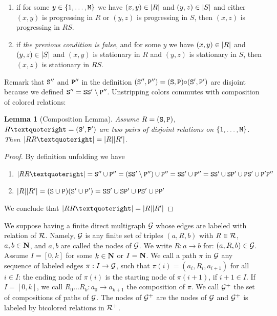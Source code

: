 \documentclass{lmcs}
\newtheorem{lemma}[theorem]{Lemma}
\begin{document}
\begin{enumerate}
\item
if for some $y\in \{1, \ldots, {\tt M}\}$ we have $(x,y) \in {| R |}$ and $(y,z) \in {| S |}$ and either 
$(x,y)$ is progressing in $R$ or $(y,z)$ is progressing in $S$, then  
$(x,z)$ is progressing in $RS$. 

\item
if \emph{the previous condition is false}, and for some $y$ we have
$(x,y) \in {| R |}$ and $(y,z) \in {| S |}$  and $(x,y)$ is stationary
in $R$ and $(y,z)$ is stationary in $S$, then  $(x,z)$ is stationary in $RS$. 
\end{enumerate}

Remark that ${\tt S}''$ and ${\tt P}''$ in the definition
 $({\tt S}'',{\tt P}'') = ({\tt S},{\tt P}) {\circ} ({\tt S}',{\tt P}')$ are disjoint 
because we defined ${\tt S}'' = {\tt S}{\tt S}' \setminus {\tt P}''$. 
Unstripping colors commutes with composition of colored relations:

\begin{lemma}[Composition Lemma]
\label{lemma-composition}
Assume $R=({\tt S},{\tt P})$, $R’=(\Stat',\Prog')$ are two pairs of disjoint relations on 
$\{1, \ldots, {\tt M}\}$. Then $\universe{RR’} = \universe{R}\universe{R'}$.
\end{lemma}

\begin{proof}
By definition unfolding we have 
\begin{enumerate}
\item
$
\universe{RR’} = 
\Stat'' \cup \Prog'' = 
(\Stat\Stat'\setminus \Prog'') \cup \Prog'' = 
\Stat\Stat'\cup \Prog'' = 
\Stat\Stat'\cup \Stat\Prog' \cup \Prog\Stat'\cup \Prog'\Prog''$

\item
$
{| R |}{| R' |} = 
({\tt S} \cup {\tt P})({\tt S}'\cup {\tt P}') = 
{\tt S}{\tt S}'\cup {\tt S}{\tt P}' \cup {\tt P}{\tt S}'\cup {\tt P}{\tt P}'
$
\end{enumerate}
We conclude that $\universe{RR’} = \universe{R}\universe{R'}$
\end{proof}

We suppose having a finite direct multigraph ${\mathcal G}$ whose edges are labeled with relation of ${\mathcal R}$. Namely, ${\mathcal G}$ is any finite set of triples $(a,R,b)$ with $R \in {\mathcal R}$, $a,b \in {\bf N}$,
and $a,b$ are called the nodes of ${\mathcal G}$. We write $R:a \rightarrow b$ for: $(a,R,b) \in {\mathcal G}$. 
Assume $I=[0,k]$ for some $k \in {\bf N}$ or $I={\bf N}$.
We call a path $\pi$  in ${\mathcal G}$ any sequence of labeled 
edges $\pi: I \rightarrow {\mathcal G}$, such that $\pi(i)=(a_i,R_i,a_{i+1})$ for all $i \in I$: the
ending node of $\pi(i)$ is the starting node of $\pi(i+1)$, if $i+1 \in I$. If $I=[0,k]$, 
we call $R_0 \ldots R_k: a_0 \rightarrow a_{k+1}$ the composition of $\pi$. 
We call ${\mathcal G}^+$ the set of compositions of paths of ${\mathcal G}$. The nodes of ${\mathcal G}^+$ are the nodes of ${\mathcal G}$ and ${\mathcal G}^+$ is labeled by bicolored relations in ${\mathcal R}^+$.
\\
\end{document}
